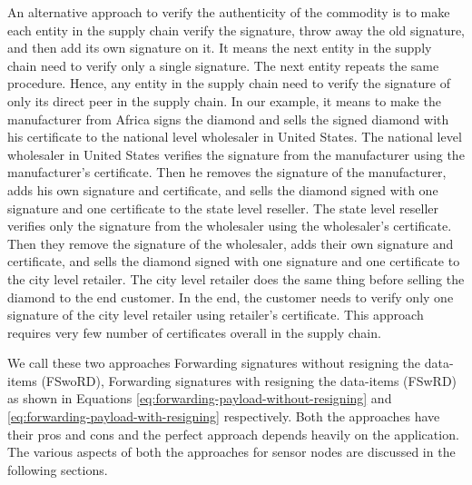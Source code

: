 	An alternative approach to verify the authenticity of the commodity is to make each entity in the supply chain verify the signature, throw away the old signature, and then add its own signature on it. 
	It means the next entity in the supply chain need to verify only a single signature.
	The next entity repeats the same procedure.
	Hence, any entity in the supply chain need to verify the signature of only its direct peer in the supply chain. 
	In our example, it means to make the manufacturer from Africa signs the diamond and sells the signed diamond with his certificate to the national level wholesaler in United States.
	The national level wholesaler in United States verifies the signature from the manufacturer using the manufacturer's certificate.
	Then he removes the signature of the manufacturer, adds his own signature and certificate, and sells the diamond signed with one signature and one certificate to the state level reseller.
	The state level reseller verifies only the signature from the wholesaler using the wholesaler's certificate.
	Then they remove the signature of the wholesaler, adds their own signature and certificate, and sells the diamond signed with one signature and one certificate to the city level retailer.
	The city level retailer does the same thing before selling the diamond to the end customer.
	In the end, the customer needs to verify only one signature of the city level retailer using retailer's certificate.
	This approach requires very few number of certificates overall in the supply chain.

	We call these two approaches Forwarding signatures without resigning the data-items (FSwoRD), Forwarding signatures with resigning the data-items (FSwRD) as shown in Equations \ref{eq:forwarding-payload-without-resigning} and \ref{eq:forwarding-payload-with-resigning} respectively.
	Both the approaches have their pros and cons and the perfect approach depends heavily on the application.
	The various aspects of both the approaches for sensor nodes are discussed in the following sections.
